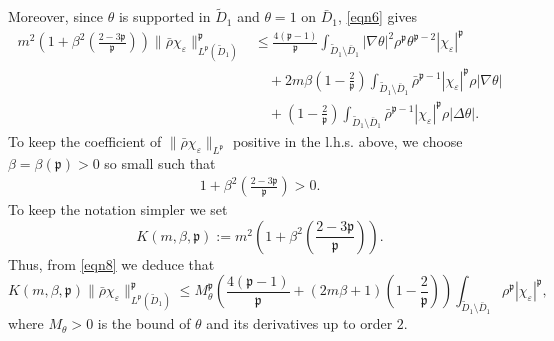 \documentclass{article}
\newcommand{\assign}{:=}
\begin{document}
%
Moreover, since $\theta$ is supported in $\tilde{D}_1$ and $\theta = 1$ on $\bar{D}_1$, \eqref{eqn6}
gives
%
\begin{align}\label{eqn8}
     m^2 \left( 1 + \beta^2 \left( \frac{2 - 3\mathfrak{p}}{\mathfrak{p}}
    \right) \right) \| \bar{\rho}  \chi_{\varepsilon} \|_{L^{\mathfrak{p}}
    (\tilde{D}_1)}^{\mathfrak{p}} & \leq \frac{4 (\mathfrak{p}-
    1)}{\mathfrak{p}} \int_{\tilde{D}_1 \setminus \bar{D}_1} | \nabla \theta
    |^2 \rho^{\mathfrak{p}} \theta^{\mathfrak{p}- 2}  | \chi_{\varepsilon}
    |^{\mathfrak{p}} \nonumber\\
    &  \quad + 2 m \beta \left( 1 - \frac{2}{\mathfrak{p}} \right)
    \int_{\tilde{D}_1 \setminus \bar{D}_1} \bar{\rho}^{\mathfrak{p}- 1} |
    \chi_{\varepsilon} |^{\mathfrak{p}} \rho | \nabla \theta | \nonumber\\
    &  \quad  + \left( 1 - \frac{2}{\mathfrak{p}} \right) \int_{\tilde{D}_1
    \setminus \bar{D}_1} \bar{\rho}^{\mathfrak{p}- 1} | \chi_{\varepsilon}
    |^{\mathfrak{p}} \rho | \Delta \theta | .
\end{align}
%
To keep the coefficient of $\| \bar{\rho}  \chi_{\varepsilon} \|_{L^{\mathfrak{p}}}$ positive in the l.h.s. above, we choose $\beta = \beta (\mathfrak{p}) > 0$ so small such that
\begin{equation}
  \begin{array}{l}
    1 + \beta^2 \left( \frac{2 - 3\mathfrak{p}}{\mathfrak{p}} \right) > 0.
  \end{array} \label{eqn-beta}
\end{equation}
%
To keep the notation simpler we set
%
\[ K (m, \beta, \mathfrak{p}) \assign m^2 \left( 1 + \beta^2 \left( \frac{2 -
   3\mathfrak{p}}{\mathfrak{p}} \right) \right) . \]
%
Thus, from \eqref{eqn8} we deduce that
%
\begin{equation}\label{eqn9}
    K (m, \beta, \mathfrak{p}) \| \bar{\rho}  \chi_{\varepsilon}
    \|_{L^{\mathfrak{p}} (\tilde{D}_1)}^{\mathfrak{p}} \leq
    M_{\theta}^{\mathfrak{p}} \left( \frac{4 (\mathfrak{p}- 1)}{\mathfrak{p}}
    + (2 m \beta + 1) \left( 1 - \frac{2}{\mathfrak{p}} \right) \right)
    \int_{\tilde{D}_1 \setminus \bar{D}_1} \rho^{\mathfrak{p}}  |
    \chi_{\varepsilon} |^{\mathfrak{p}},
\end{equation}
%
where $M_{\theta} > 0$ is the bound of $\theta$ and its derivatives up to
order $2$.\\
\end{document}

